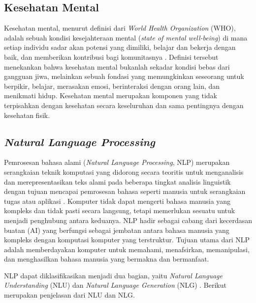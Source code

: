 \subsection{Kesehatan Mental}
Kesehatan mental, menurut definisi dari \textit{World Health Organization} (WHO), adalah sebuah kondisi kesejahteraan mental (\textit{state of mental well-being})
di mana setiap individu sadar akan potensi yang dimiliki, belajar dan bekerja dengan baik, dan memberikan kontribusi bagi komunitasnya \cite{WHO2022MentalHealth}.
Definisi tersebut menekankan bahwa kesehatan mental bukanlah sekadar kondisi bebas dari gangguan jiwa, melainkan sebuah fondasi yang memungkinkan seseorang untuk berpikir, belajar, merasakan emosi, berinteraksi dengan orang lain, dan menikmati hidup.
Kesehatan mental merupakan komponen yang tidak terpisahkan dengan kesehatan secara keseluruhan dan sama pentingnya dengan kesehatan fisik.

\subsection{\textit{Natural Language Processing}}
Pemrosesan bahasa alami (\textit{Natural Language Processing}, NLP) merupakan serangkaian teknik komputasi yang didorong secara teoritis untuk menganalisis dan merepresentasikan
teks alami pada beberapa tingkat analisis linguistik dengan tujuan mencapai pemrosesan bahasa seperti manusia untuk serangkaian tugas atau aplikasi \cite{Liddy2001NLP}.
Komputer tidak dapat mengerti bahasa manusia yang kompleks dan tidak pasti secara langsung, tetapi memerlukan sesuatu untuk menjadi penghubung antara keduanya.
NLP hadir sebagai cabang dari kecerdasan buatan (AI) yang berfungsi sebagai jembatan antara bahasa manusia yang kompleks dengan komputasi komputer yang terstruktur.
Tujuan utama dari NLP adalah memberdayakan komputer untuk memahami, menafsirkan, memanipulasi, dan menghasilkan bahasa manusia yang bermakna dan bermanfaat.

NLP dapat diklasifikasikan menjadi dua bagian, yaitu \textit{Natural Language Understanding} (NLU) dan \textit{Natural Language Generation} (NLG) \cite{Khurana2022AboutNLP}.
Berikut merupakan penjelasan dari NLU dan NLG.

